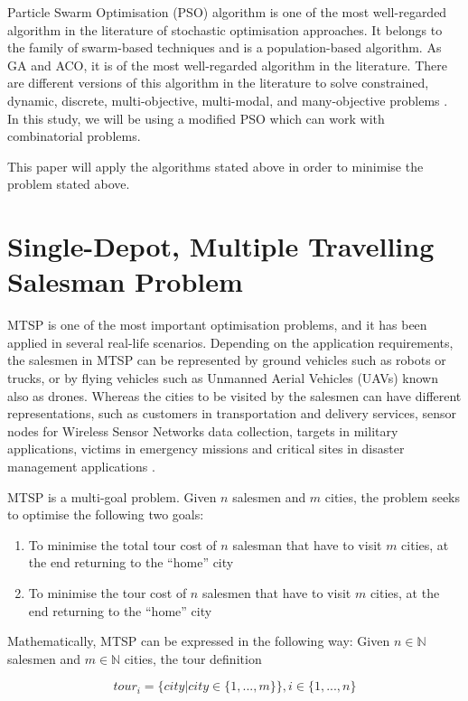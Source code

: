 \documentclass[conference]{IEEEtran}
\begin{document}
Particle Swarm Optimisation (PSO) algorithm is one of the most well-regarded algorithm in the literature of stochastic optimisation
approaches. It belongs to the family of swarm-based techniques and is a population-based algorithm. As GA and ACO, it is
of the most well-regarded algorithm in the literature. There are different versions of this algorithm in the literature
to solve constrained, dynamic, discrete, multi-objective, multi-modal, and many-objective problems \cite{b3}. In this study,
we will be using a modified PSO which can work with combinatorial problems.

This paper will apply the algorithms stated above in order to minimise the problem stated above.

\section{Single-Depot, Multiple Travelling Salesman Problem}
MTSP is one of the most important optimisation problems, and it has been applied in several real-life scenarios. Depending
on the application requirements, the salesmen in MTSP can be represented by ground vehicles such as robots or trucks, or by
flying vehicles such as Unmanned Aerial Vehicles (UAVs) known also as drones. Whereas the cities to be visited by the salesmen
can have different representations, such as customers in transportation and delivery services, sensor nodes for Wireless Sensor
Networks data collection, targets in military applications, victims in emergency missions and critical sites in disaster management
applications \cite{b1}.

MTSP is a multi-goal problem. Given $n$ salesmen and $m$ cities, the problem seeks to optimise the following two goals:
\begin{enumerate}
    \item To minimise the total tour cost of $n$ salesman that have to visit $m$ cities, at the end returning to the ``home'' city
    \item To minimise the tour cost of $n$ salesmen that have to visit $m$ cities, at the end returning to the ``home'' city
\end{enumerate}

Mathematically, MTSP can be expressed in the following way: Given $n \in \mathbb{N}$ salesmen and $m \in \mathbb{N}$ cities,
the tour definition

\begin{equation}
    tour_i = \{city | city \in \{1, ..., m\}\}, i \in \{1, ..., n\}
\end{equation}
\end{document}
